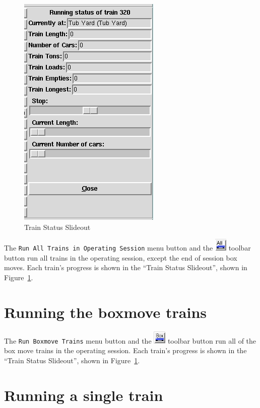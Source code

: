 \begin{figure}[hbpt]
\begin{centering}
\includegraphics{FCFTrainStatusSlideout.png}
\caption{Train Status Slideout}
\label{fig:fcf:trainstatusslideout}
\end{centering}
\end{figure}
The \verb=Run All Trains in Operating Session= menu button and the
\includegraphics{FCFRunAllTrTool.png} toolbar button run all trains in
the operating session, except the end of session box moves.  Each
train's progress is shown in the ``Train Status Slideout'', shown in
Figure~\ref{fig:fcf:trainstatusslideout}.

\section{Running the boxmove trains}

The \verb=Run Boxmove Trains= menu button and the
\includegraphics{FCFRunBTrTool.png} toolbar button run all of the box
move trains in the operating session.  Each train's progress is shown
in the ``Train Status Slideout'', shown in
Figure~\ref{fig:fcf:trainstatusslideout}.

\section{Running a single train}

